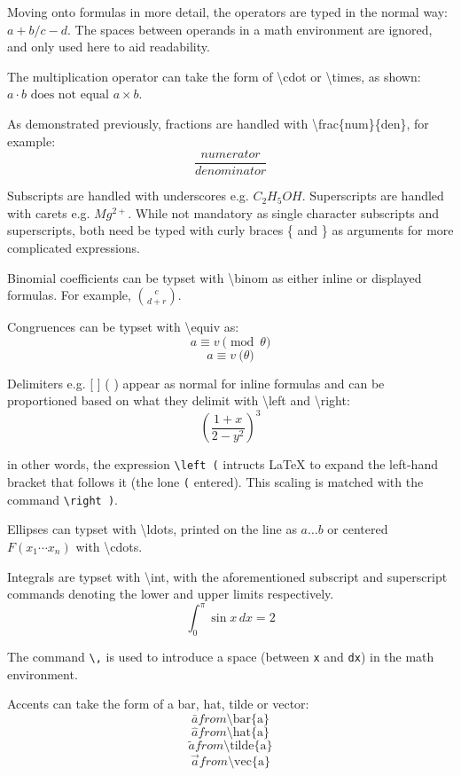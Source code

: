 \documentclass{sample}
\begin{document}
Moving onto formulas in more detail, the operators are typed in the normal way: $a + b / c -d$. The spaces between operands in a math environment are ignored, and only used here to aid readability.

The multiplication operator can take the form of \textbackslash cdot or \textbackslash times, as shown: $a \cdot b \text{ does not equal } a \times b$.

As demonstrated previously, fractions are handled with \textbackslash frac\{num\}\{den\}, for example:
\[
\frac{numerator}{denominator}
\]

Subscripts are handled with underscores e.g. $C_{2}H_{5}OH$. Superscripts are handled with carets e.g. $Mg^{2+}$. While not mandatory as single character subscripts and superscripts, both need be typed with curly braces \{ and \} as arguments for more complicated expressions.

Binomial coefficients can be typset with \textbackslash binom as either inline or displayed formulas. For example, $\binom{c}{d + r}$.

Congruences can be typset with \textbackslash equiv as:
\[
a \equiv v \pmod{\theta}
\]
\[
a \equiv v \pod{\theta}
\]

Delimiters e.g. [ ] ( ) appear as normal for inline formulas and can be proportioned based on what they delimit with \textbackslash left and \textbackslash right:
\[
\left(\frac{1 + x}{2 - y^2} \right)^3
\]

in other words, the expression \texttt{\textbackslash left (} intructs LaTeX to expand the left-hand bracket that follows it (the lone \texttt{(} entered). This scaling is matched with the command  \texttt{\textbackslash right )}.

Ellipses can typset with \textbackslash ldots, printed on the line as $a\ldots b$ or centered $F(x_1 \cdots x_n)$ with \textbackslash cdots.

Integrals are typset with \textbackslash int, with the aforementioned subscript and superscript commands denoting the lower and upper limits respectively. 
\[
\int_0^{\pi} \sin x \, dx = 2
\]

The command \texttt{\textbackslash ,} is used to introduce a space (between \texttt{x} and \texttt{dx}) in the math environment.

Accents can take the form of a bar, hat, tilde or vector:
\[
\bar{a} from \text{\textbackslash bar\{a\}}
\]
\[
\hat{a} from \text{\textbackslash hat\{a\}}
\]
\[
\tilde{a} from \text{\textbackslash tilde\{a\}}
\]
\[
\vec{a} from \text{\textbackslash vec\{a\}}
\]
\end{document}
